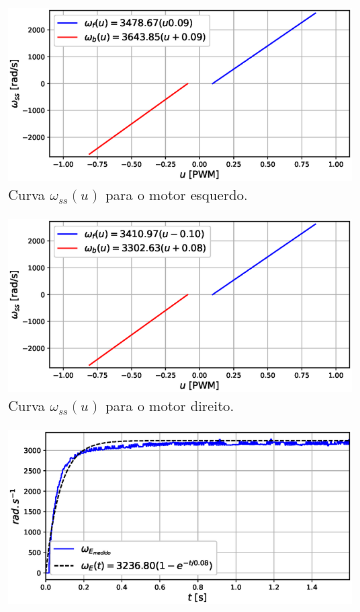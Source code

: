 \begin{figure}[H]
    \begin{subfigure}{.5\textwidth}
    \centering
    \includegraphics[width=\textwidth]{figuras/resultados/exp01/curva_feedforward_esquerdo100.eps}
    \caption{Curva $\omega_{ss}(u)$ para o motor esquerdo.}
    \label{fig:exp01:curva_feedforward_esquerdo}
    \end{subfigure}
    \hfill
    \begin{subfigure}{.5\textwidth}
    \centering
    \includegraphics[width=\textwidth]{figuras/resultados/exp01/curva_feedforward_direito100.eps}
    \caption{Curva $\omega_{ss}(u)$ para o motor direito.}
    \label{fig:exp01:curva_feedforward_direito}
    \end{subfigure}
    \begin{subfigure}{.5\textwidth}
    \centering
    \includegraphics[width=\textwidth]{figuras/resultados/exp01/regressao_vs_medido_esquerdo100.eps}

\end{subfigure}
\end{figure}
